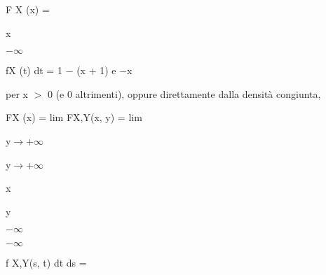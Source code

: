 \documentclass[a4paper,portrait,12pt]{article}
\begin{document}
\begin{flushleft}
F X (x) =
\end{flushleft}





\begin{flushleft}
x
\end{flushleft}


$-$$\infty$





\begin{flushleft}
fX (t) dt = 1 $-$ (x + 1) e $-$x
\end{flushleft}





\begin{flushleft}
per x $>$ 0 (e 0 altrimenti), oppure direttamente dalla densit\`{a} congiunta,
\end{flushleft}


\begin{flushleft}
FX (x) = lim FX,Y(x, y) = lim
\end{flushleft}


\begin{flushleft}
y$\rightarrow$+$\infty$
\end{flushleft}





\begin{flushleft}
y$\rightarrow$+$\infty$
\end{flushleft}





\begin{flushleft}
x
\end{flushleft}





\begin{flushleft}
y
\end{flushleft}





$-$$\infty$





$-$$\infty$





\begin{flushleft}
f X,Y(s, t) dt ds =
\end{flushleft}
\end{document}
